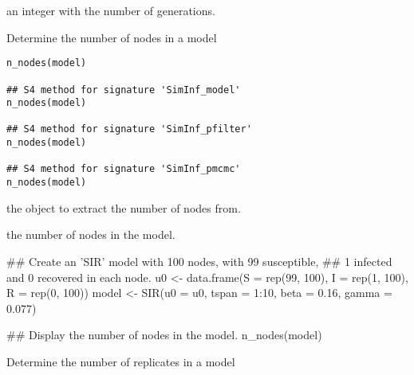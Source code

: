 \documentclass[letterpaper]{book}
\begin{document}
%
\begin{Value}
an integer with the number of generations.
\end{Value}
%
\begin{Description}
Determine the number of nodes in a model
\end{Description}
%
\begin{Usage}
\begin{verbatim}
n_nodes(model)

## S4 method for signature 'SimInf_model'
n_nodes(model)

## S4 method for signature 'SimInf_pfilter'
n_nodes(model)

## S4 method for signature 'SimInf_pmcmc'
n_nodes(model)
\end{verbatim}
\end{Usage}
%
\begin{Arguments}
\begin{ldescription}
\item[\code{model}] the  object to extract the number of
nodes from.
\end{ldescription}
\end{Arguments}
%
\begin{Value}
the number of nodes in the model.
\end{Value}
%
\begin{Examples}
\begin{ExampleCode}
## Create an 'SIR' model with 100 nodes, with 99 susceptible,
## 1 infected and 0 recovered in each node.
u0 <- data.frame(S = rep(99, 100), I = rep(1, 100), R = rep(0, 100))
model <- SIR(u0 = u0, tspan = 1:10, beta = 0.16, gamma = 0.077)

## Display the number of nodes in the model.
n_nodes(model)
\end{ExampleCode}
\end{Examples}
%
\begin{Description}
Determine the number of replicates in a model
\end{Description}
\end{document}
